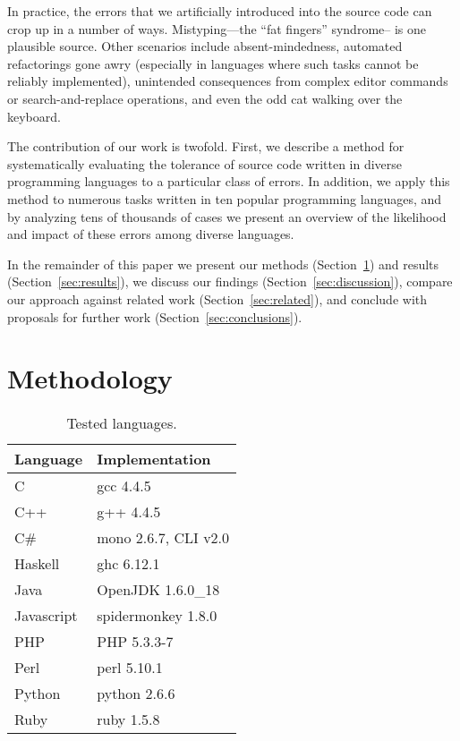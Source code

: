 \documentclass[10pt]{sigplanconf}
\begin{document}
In practice,
the errors that we artificially introduced into the source code can
crop up in a number of ways.
Mistyping---the ``fat fingers'' syndrome-- is one plausible source.
Other scenarios include
absent-mindedness,
automated refactorings gone awry
(especially in languages where such tasks cannot be reliably implemented),
unintended consequences from complex editor commands or
search-and-replace operations,
and even the odd cat walking over the keyboard.

The contribution of our work is twofold.
First, we describe a method for systematically evaluating the tolerance
of source code written in diverse programming languages to a particular
class of errors.
In addition, we apply this method to numerous tasks written in ten popular
programming languages,
and by analyzing tens of thousands of cases we present an overview of
the likelihood and impact of these errors among diverse languages.

In the remainder of this paper we present our
methods (Section~\ref{sec:method}) and
results (Section~\ref{sec:results}),
we discuss our findings (Section~\ref{sec:discussion}),
compare our approach against related work
(Section~\ref{sec:related}),
and conclude with proposals for further work
(Section~\ref{sec:conclusions}).

\section{Methodology} %
\label{sec:method}

\begin{table}
\begin{center}
\begin{tabular}{ l l}
 \hline
Language & Implementation \\
\hline
C 			& gcc 4.4.5 \\
C++ 		& g++ 4.4.5 \\
C\# 		& mono 2.6.7, CLI v2.0 \\
Haskell 	& ghc 6.12.1 \\
Java 		& OpenJDK 1.6.0\_18 \\
Javascript 	& spidermonkey 1.8.0 \\
PHP 		& PHP 5.3.3-7 \\
Perl 		& perl 5.10.1 \\
Python 		& python 2.6.6 \\
Ruby 		& ruby 1.5.8 \\
\hline
\end{tabular}
\end{center}
\caption{Tested languages.}
\label{tab:langs}
\end{table}
\end{document}
